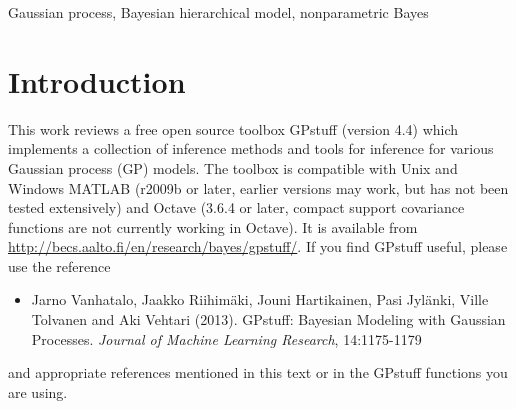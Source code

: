 \documentclass[twoside,11pt]{article}
\newcommand{\pkg}[1]{{\fontseries{b}\selectfont #1}}
\newcommand{\proglang}{}
\begin{document}
\begin{abstract}%
  Gaussian processes (GP) are powerful tools for probabilistic
  modeling purposes. They can be used to define prior distributions
  over latent functions in hierarchical Bayesian models. The prior
  over functions is defined implicitly by the mean and covariance
  function, which determine the smoothness and variability of the
  function. The inference can then be conducted directly in the
  function space by evaluating or approximating the posterior process.
  Despite their attractive theoretical properties GPs provide
  practical challenges in their implementation. \pkg{GPstuff} is a
  versatile collection of computational tools for GP models compatible
  with Linux and Windows \proglang{MATLAB} and Octave.  It includes,
  among others, various inference methods, sparse approximations and
  tools for model assessment. In this work, we review these tools and
  demonstrate the use of \pkg{GPstuff} in several models.\\ Last updated 2014-04-11.
\end{abstract}

\begin{keywords}
Gaussian process, Bayesian hierarchical model, nonparametric Bayes
\end{keywords}

% 

\newpage

\tableofcontents

\section{Introduction}

This work reviews a free open source toolbox \pkg{GPstuff} (version
4.4) which implements a collection of inference methods and tools for
inference for various Gaussian process (GP) models. The toolbox is
compatible with Unix and Windows \proglang{MATLAB} \citep{MATLAB:2010}
(r2009b or later, earlier versions may work, but has not been tested
extensively) and \proglang{Octave} \citep{octave:2012} (3.6.4 or
later, compact support covariance functions are not currently working
in Octave). It is available from
\url{http://becs.aalto.fi/en/research/bayes/gpstuff/}.
If you find GPstuff useful, please use the reference \citep{Vanhatalo+gpstuff:2013}
\begin{itemize}
\item[] Jarno Vanhatalo, Jaakko Riihim{\"a}ki, Jouni Hartikainen, Pasi
  Jyl{\"a}nki, Ville Tolvanen and Aki Vehtari (2013). GPstuff: Bayesian
  Modeling with Gaussian Processes. \emph{Journal of Machine Learning
    Research}, 14:1175-1179
\end{itemize}
and appropriate references mentioned in this text or in the GPstuff
functions you are using.
\end{document}
